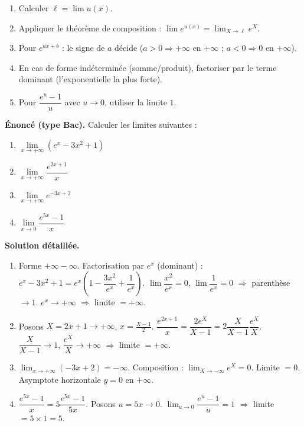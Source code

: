 \documentclass[11pt]{article}
\newcommand{\cle}[1]{{\popxbold\color{popdark}#1}}
\begin{document}
\begin{methode}
\begin{enumerate}
\item Calculer $\ell=\lim u(x)$.
\item Appliquer le théorème de composition : $\lim e^{u(x)} = \lim_{X\to\ell}e^{X}$.
\item Pour $e^{ax+b}$ : le signe de $a$ décide ($a>0 \Rightarrow +\infty$ en $+\infty$ ; $a<0 \Rightarrow 0$ en $+\infty$).
\item En cas de forme indéterminée (somme/produit), \cle{factoriser par le terme dominant} (l'exponentielle la plus forte).
\item Pour $\dfrac{e^{u}-1}{u}$ avec $u\to 0$, utiliser la limite $1$.
\end{enumerate}
\end{methode}

\begin{exoresolu}
\textbf{Énoncé (type Bac).} Calculer les limites suivantes :
\begin{enumerate}
\item $\lim\limits_{x\to +\infty}\left(e^{x}-3x^{2}+1\right)$
\item $\lim\limits_{x\to +\infty}\dfrac{e^{2x+1}}{x}$
\item $\lim\limits_{x\to +\infty}e^{-3x+2}$
\item $\lim\limits_{x\to 0}\dfrac{e^{5x}-1}{x}$
\end{enumerate}
\tcblower
\textbf{Solution détaillée.}
\begin{enumerate}
\item Forme $+\infty-\infty$. Factorisation par $e^{x}$ (dominant) :
$e^{x}-3x^{2}+1 = e^{x}\left(1-\dfrac{3x^{2}}{e^{x}}+\dfrac{1}{e^{x}}\right)$.
$\lim\dfrac{x^{2}}{e^{x}}=0$, $\lim\dfrac{1}{e^{x}}=0$ $\Rightarrow$ parenthèse $\to 1$.
$e^{x}\to +\infty$ $\Rightarrow$ limite $= +\infty$.

\item Posons $X=2x+1 \to +\infty$, $x=\frac{X-1}{2}$.
$\dfrac{e^{2x+1}}{x} = \dfrac{2e^{X}}{X-1} = 2\dfrac{X}{X-1}\dfrac{e^{X}}{X}$.
$\dfrac{X}{X-1}\to 1$, $\dfrac{e^{X}}{X}\to +\infty$ $\Rightarrow$ limite $= +\infty$.

\item $\lim_{x\to+\infty}(-3x+2)=-\infty$. Composition : $\lim_{X\to-\infty}e^{X}=0$.
Limite $= 0$. Asymptote horizontale $y=0$ en $+\infty$.

\item $\dfrac{e^{5x}-1}{x} = 5\dfrac{e^{5x}-1}{5x}$. Posons $u=5x\to 0$.
$\lim_{u\to 0}\dfrac{e^{u}-1}{u}=1$ $\Rightarrow$ limite $= 5\times 1 = 5$.
\end{enumerate}
\end{exoresolu}
\end{document}
